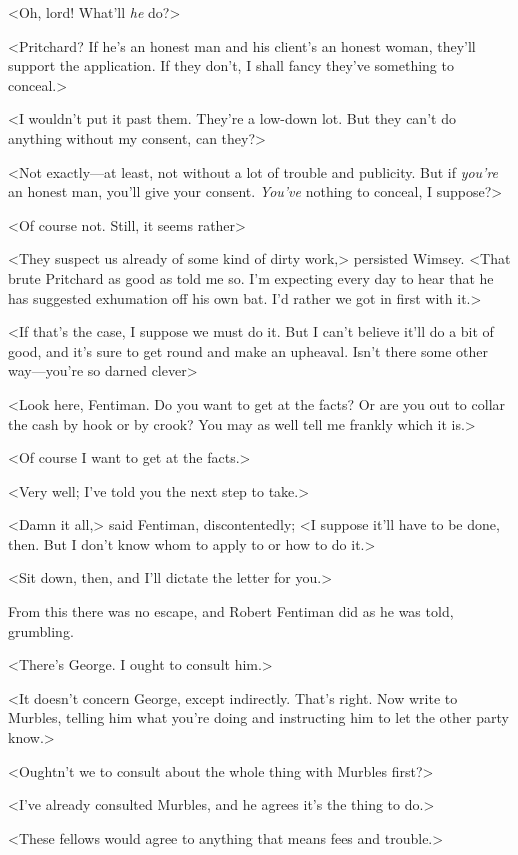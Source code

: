 <Oh, lord! What'll \emph{he} do?>

<Pritchard? If he's an honest man and his client's an honest woman, they'll support the application. If they don't, I shall fancy they've something to conceal.>

<I wouldn't put it past them. They're a low-down lot. But they can't do anything without my consent, can they?>

<Not exactly—at least, not without a lot of trouble and publicity. But if \emph{you're} an honest man, you'll give your consent. \emph{You've} nothing to conceal, I suppose?>

<Of course not. Still, it seems rather\longdash>

<They suspect us already of some kind of dirty work,> persisted Wimsey. <That brute Pritchard as good as told me so. I'm expecting every day to hear that he has suggested exhumation off his own bat. I'd rather we got in first with it.>

<If that's the case, I suppose we must do it. But I can't believe it'll do a bit of good, and it's sure to get round and make an upheaval. Isn't there some other way—you're so darned clever\longdash>

<Look here, Fentiman. Do you want to get at the facts? Or are you out to collar the cash by hook or by crook? You may as well tell me frankly which it is.>

<Of course I want to get at the facts.>

<Very well; I've told you the next step to take.>

<Damn it all,> said Fentiman, discontentedly; <I suppose it'll have to be done, then. But I don't know whom to apply to or how to do it.>

<Sit down, then, and I'll dictate the letter for you.>

From this there was no escape, and Robert Fentiman did as he was told, grumbling.

<There's George. I ought to consult him.>

<It doesn't concern George, except indirectly. That's right. Now write to Murbles, telling him what you're doing and instructing him to let the other party know.>

<Oughtn't we to consult about the whole thing with Murbles first?>

<I've already consulted Murbles, and he agrees it's the thing to do.>

<These fellows would agree to anything that means fees and trouble.>

